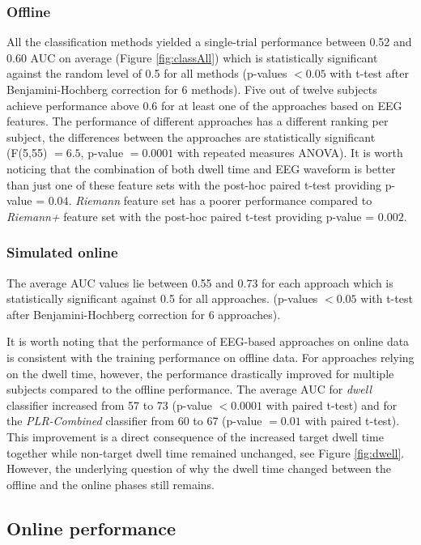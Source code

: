 \documentclass[12pt]{iopart}
\begin{document}
\subsubsection*{Offline}
All the classification methods yielded a single-trial 
performance between 0.52 and 0.60 AUC on average
(Figure \ref{fig:classAll})
which is statistically significant against the random level of 0.5 
for all methods
(p-values $< 0.05$ with t-test after Benjamini-Hochberg correction
for 6 methods).
Five out of twelve subjects achieve performance 
above 0.6 for at least one of the approaches based
on EEG features.
The performance of different approaches has a different ranking per subject,
the differences between
the approaches are statistically significant (F(5,55) $=6.5$, p-value $= 0.0001$ with repeated measures ANOVA).
It is worth noticing that the combination of both dwell time and EEG waveform is
better than just one of these feature sets with the post-hoc paired t-test
providing p-value = $0.04$.
\textit{Riemann} feature set has a poorer performance compared to \textit{Riemann+}
feature set with the post-hoc paired t-test providing p-value = $0.002$.

\subsubsection*{Simulated online}
The average AUC values lie between 0.55 and 0.73 for each approach
which is statistically significant against 0.5
for all approaches.
(p-values $< 0.05$ with t-test after Benjamini-Hochberg correction 
for 6 approaches).

It is worth noting that the performance of EEG-based approaches
on online data is consistent with the training performance on offline data.
For approaches relying on the dwell time, however, the performance drastically improved
for multiple subjects compared to the offline performance.
The average AUC for \textit{dwell} classifier increased
from 57 to 73 (p-value $< 0.0001$ with paired t-test) and for 
the \textit{PLR-Combined} classifier from 60 to 67 (p-value $= 0.01$ with paired t-test).
This improvement is a direct consequence of the increased target dwell time
together while non-target dwell time remained unchanged, see Figure \ref{fig:dwell}.
However, the underlying question of why the dwell time changed 
between the offline and the online phases still remains.


\subsection{Online performance}
\end{document}

